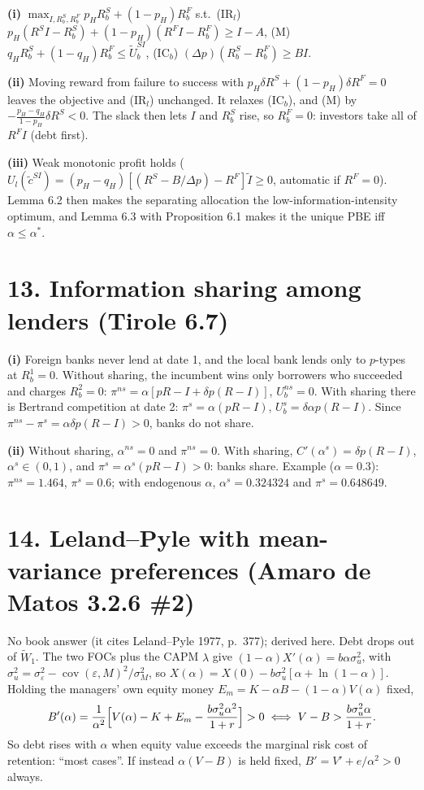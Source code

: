 \documentclass[11pt,a4paper]{article}
\begin{document}
\textbf{(i)} $\max_{I,R_b^S,R_b^F}p_HR_b^S+(1-p_H)R_b^F$ s.t.\
(IR$_l$) $p_H(R^SI-R_b^S)+(1-p_H)(R^FI-R_b^F)\ge I-A$,
(M) $q_HR_b^S+(1-q_H)R_b^F\le\tilde U_b^{SI}$,
(IC$_b$) $(\Delta p)(R_b^S-R_b^F)\ge BI$.

\textbf{(ii)} Moving reward from failure to success with $p_H\delta R^S+(1-p_H)\delta R^F=0$ leaves the objective
and (IR$_l$) unchanged. It relaxes (IC$_b$), and (M) by $-\frac{p_H-q_H}{1-p_H}\delta R^S<0$. The slack then
lets $I$ and $R_b^S$ rise, so $R_b^F=0$: investors take all of $R^FI$ (debt first).

\textbf{(iii)} Weak monotonic profit holds ($U_l(\tilde c^{SI})=(p_H-q_H)[(R^S-B/\Delta p)-R^F]\tilde I\ge0$,
automatic if $R^F=0$). Lemma 6.2 then makes the separating allocation the low-information-intensity
optimum, and Lemma 6.3 with Proposition 6.1 makes it the unique PBE iff $\alpha\le\alpha^*$.

\section*{13. Information sharing among lenders (Tirole 6.7)}

\textbf{(i)} Foreign banks never lend at date 1, and the local bank lends only to $p$-types at
$R_b^1=0$. Without sharing, the incumbent wins only borrowers who succeeded and charges $R_b^2=0$:
$\pi^{ns}=\alpha[pR-I+\delta p(R-I)]$, $U_b^{ns}=0$. With sharing there is Bertrand competition at date 2:
$\pi^s=\alpha(pR-I)$, $U_b^s=\delta\alpha p(R-I)$. Since $\pi^{ns}-\pi^s=\alpha\delta p(R-I)>0$, banks do not share.

\textbf{(ii)} Without sharing, $\alpha^{ns}=0$ and $\pi^{ns}=0$. With sharing, $C'(\alpha^s)=\delta p(R-I)$,
$\alpha^s\in(0,1)$, and $\pi^s=\alpha^s(pR-I)>0$: banks share. Example ($\alpha=0.3$): $\pi^{ns}=1.464$,
$\pi^s=0.6$; with endogenous $\alpha$, $\alpha^s=0.324324$ and $\pi^s=0.648649$.

\section*{14. Leland--Pyle with mean-variance preferences (Amaro de Matos 3.2.6 \#2)}

No book answer (it cites Leland--Pyle 1977, p.~377); derived here. Debt drops out of $\widetilde W_1$. The two
FOCs plus the CAPM $\lambda$ give $(1-\alpha)X'(\alpha)=b\alpha\sigma_u^2$, with
$\sigma_u^2=\sigma_\varepsilon^2-\operatorname{cov}(\varepsilon,M)^2/\sigma_M^2$, so
$X(\alpha)=X(0)-b\sigma_u^2[\alpha+\ln(1-\alpha)]$. Holding the managers' own equity money
$E_m=K-\alpha B-(1-\alpha)V(\alpha)$ fixed,
$$B'(\alpha)=\frac{1}{\alpha^2}\Bigl[V(\alpha)-K+E_m-\frac{b\sigma_u^2\alpha^2}{1+r}\Bigr]>0
\iff V-B>\frac{b\sigma_u^2\alpha}{1+r}.$$
So debt rises with $\alpha$ when equity value exceeds the marginal risk cost of retention: ``most cases''.
If instead $\alpha(V-B)$ is held fixed, $B'=V'+e/\alpha^2>0$ always.
\end{document}
